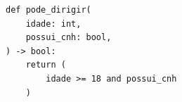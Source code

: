\ifmostrarGabarito
\begin{verbatim}
def pode_dirigir(
    idade: int,
    possui_cnh: bool,
) -> bool:
    return (
        idade >= 18 and possui_cnh
    )
\end{verbatim}

\fi
